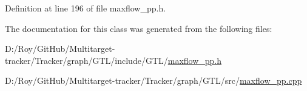 Definition at line 196 of file maxflow\+\_\+pp.\+h.



The documentation for this class was generated from the following files\+:\begin{DoxyCompactItemize}
\item 
D\+:/\+Roy/\+Git\+Hub/\+Multitarget-\/tracker/\+Tracker/graph/\+G\+T\+L/include/\+G\+T\+L/\mbox{\hyperlink{maxflow__pp_8h}{maxflow\+\_\+pp.\+h}}\item 
D\+:/\+Roy/\+Git\+Hub/\+Multitarget-\/tracker/\+Tracker/graph/\+G\+T\+L/src/\mbox{\hyperlink{maxflow__pp_8cpp}{maxflow\+\_\+pp.\+cpp}}\end{DoxyCompactItemize}
